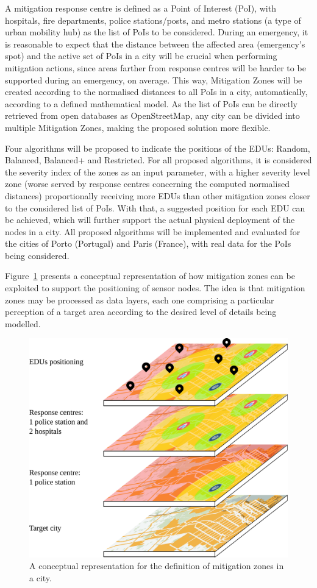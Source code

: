 \begin{refsection}
A mitigation response centre is defined as a Point of Interest (PoI), with hospitals, fire departments, police stations/posts, and metro stations (a type of urban mobility hub) as the list of PoIs to be considered. During an emergency, it is reasonable to expect that the distance between the affected area (emergency's spot) and the active set of PoIs in a city will be crucial when performing mitigation actions, since areas farther from response centres will be harder to be supported during an emergency, on average. This way, Mitigation Zones will be created according to the normalised distances to all PoIs in a city, automatically, according to a defined mathematical model. As the list of PoIs can be directly retrieved from open databases as OpenStreetMap, any city can be divided into multiple Mitigation Zones, making the proposed solution more flexible.

Four algorithms will be proposed to indicate the positions of the EDUs: Random, Balanced, Balanced+ and Restricted. For all proposed algorithms, it is considered the severity index of the zones as an input parameter, with a higher severity level zone (worse served by response centres concerning the computed normalised distances) proportionally receiving more EDUs than other mitigation zones closer to the considered list of PoIs. With that, a suggested position for each EDU can be achieved, which will further support the actual physical deployment of the nodes in a city. All proposed algorithms will be implemented and evaluated for the cities of Porto (Portugal) and Paris (France), with real data for the PoIs being considered. 

Figure~\ref{fig:smartcity} presents a conceptual representation of how mitigation zones can be exploited to support the positioning of sensor nodes. The idea is that mitigation zones may be processed as data layers, each one comprising a particular perception of a target area according to the desired level of details being modelled.

\begin{figure}[htbp!]
  \centering
  \includegraphics[width=0.7\linewidth]{Chapters/2-EDUs/images/map_layers.pdf}
  \caption{A conceptual representation for the definition of mitigation zones in a city.}\label{fig:smartcity}
\end{figure}


\end{refsection}
